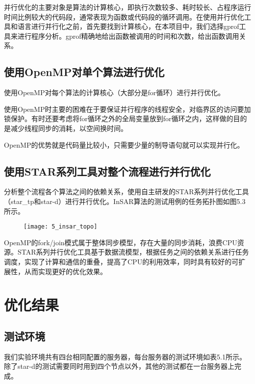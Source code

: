 并行优化的主要对象是算法的计算核心，即执行次数较多、耗时较长、占程序运行时间比例较大的代码段，通常表现为函数或代码段的循环调用。在使用并行优化工具和语言进行并行化之前，首先要找到计算核心，在本项目中，我们选择gprof工具来进行程序分析。gprof精确地给出函数被调用的时间和次数，给出函数调用关系。

\subsection{使用OpenMP对单个算法进行优化}

使用OpenMP对每个算法的计算核心（大部分是for循环）进行并行优化。

使用OpenMP时主要的困难在于要保证并行程序的线程安全，对临界区的访问要加锁保护。有时还要考虑将for循环之外的全局变量放到for循环之内，这样做的目的是减少线程同步的消耗，以空间换时间。

OpenMP的优势就是代码量比较小，只需要少量的制导语句就可以实现并行化。

\subsection{使用STAR系列工具对整个流程进行并行优化}

分析整个流程各个算法之间的依赖关系，使用自主研发的STAR系列并行优化工具（star\_tp和star-d）进行并行优化。InSAR算法的测试用例的任务拓扑图如图5.3所示。

\begin{figure}[!htbp]
    \centering
    \texttt{[image: 5\_insar\_topo]}
    \label{fig:5_insar_topo}
\end{figure}

OpenMP的fork/join模式属于整体同步模型，存在大量的同步消耗，浪费CPU资源。STAR系列并行优化工具基于数据流模型，根据任务之间的依赖关系进行任务调度，实现了计算和通信的重叠，提高了CPU的利用效率，同时具有较好的可扩展性，从而实现更好的优化效果。

\section{优化结果}

\subsection{测试环境}

我们实验环境共有四台相同配置的服务器，每台服务器的测试环境如表5.1所示。除了star-d的测试需要同时用到四个节点以外，其他的测试都在一台服务器上完成。

